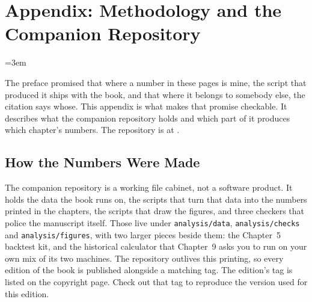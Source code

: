 \chapter*{Appendix: Methodology and the Companion Repository}

\begingroup
\emergencystretch=3em
\sloppy

The preface promised that where a number in these pages is mine, the
script that produced it ships with the book, and that where it belongs to
somebody else, the citation says whose. This appendix is what makes that
promise checkable. It describes what the companion repository holds and which
part of it produces which chapter's numbers. The repository is at \repourl.

\section*{How the Numbers Were Made}

The companion repository is a working file cabinet, not a software product. It
holds the data the book runs on, the scripts that turn that data into the
numbers printed in the chapters, the scripts that draw the figures, and three
checkers that police the manuscript itself. Those live under \texttt{analysis/data},
\texttt{analysis/checks} and \texttt{analysis/figures}, with two larger pieces
beside them: the Chapter~5 backtest kit, and the historical calculator that
Chapter~9 asks you to run on your own mix of its two machines. The repository outlives this
printing, so every edition of the book is published alongside a matching tag.
The edition's tag is listed on the copyright page. Check out that tag to reproduce the version used for this edition. %

